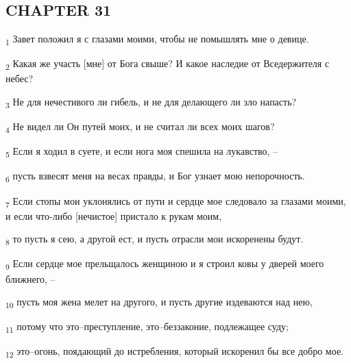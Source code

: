 \subsection{CHAPTER 31}
\begin{tcolorbox}
\textsubscript{1} Завет положил я с глазами моими, чтобы не помышлять мне о девице.
\end{tcolorbox}
\begin{tcolorbox}
\textsubscript{2} Какая же участь [мне] от Бога свыше? И какое наследие от Вседержителя с небес?
\end{tcolorbox}
\begin{tcolorbox}
\textsubscript{3} Не для нечестивого ли гибель, и не для делающего ли зло напасть?
\end{tcolorbox}
\begin{tcolorbox}
\textsubscript{4} Не видел ли Он путей моих, и не считал ли всех моих шагов?
\end{tcolorbox}
\begin{tcolorbox}
\textsubscript{5} Если я ходил в суете, и если нога моя спешила на лукавство, --
\end{tcolorbox}
\begin{tcolorbox}
\textsubscript{6} пусть взвесят меня на весах правды, и Бог узнает мою непорочность.
\end{tcolorbox}
\begin{tcolorbox}
\textsubscript{7} Если стопы мои уклонялись от пути и сердце мое следовало за глазами моими, и если что-либо [нечистое] пристало к рукам моим,
\end{tcolorbox}
\begin{tcolorbox}
\textsubscript{8} то пусть я сею, а другой ест, и пусть отрасли мои искоренены будут.
\end{tcolorbox}
\begin{tcolorbox}
\textsubscript{9} Если сердце мое прельщалось женщиною и я строил ковы у дверей моего ближнего, --
\end{tcolorbox}
\begin{tcolorbox}
\textsubscript{10} пусть моя жена мелет на другого, и пусть другие издеваются над нею,
\end{tcolorbox}
\begin{tcolorbox}
\textsubscript{11} потому что это--преступление, это--беззаконие, подлежащее суду;
\end{tcolorbox}
\begin{tcolorbox}
\textsubscript{12} это--огонь, поядающий до истребления, который искоренил бы все добро мое.
\end{tcolorbox}
